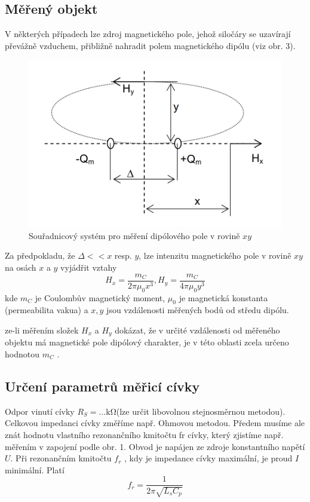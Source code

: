 \documentclass{article}
\begin{document}
\subsection{Měřený objekt}
V některých případech lze zdroj magnetického pole, jehož siločáry se uzavírají převážně vzduchem, přibližně nahradit polem magnetického dipólu (viz obr. 3).
\begin{figure}[H]
	\centering
	\includegraphics[width=0.6\linewidth]{screenshot002}
	\caption{Souřadnicový systém pro měření dipólového pole v rovině $xy$}
	\label{fig:screenshot002}
\end{figure}

Za předpokladu, že $\Delta<<x$ resp. $y$, lze intenzitu magnetického pole v rovině $xy$ na osách $x$ a $y $ vyjádřit vztahy
\begin{equation}
	H_x = \frac{m_C}{2\pi\mu_0x^3}, H_y = \frac{m_C}{4\pi\mu_0y^3}
\end{equation}
kde $m_C$ je Coulombův magnetický moment, $\mu_0$ je magnetická konstanta (permeabilita vakua) a $x,y$ jsou vzdálenosti měřených bodů od středu dipólu.

ze-li měřením složek $H_x$ a $H_y$ dokázat, že v určité vzdálenosti od měřeného objektu má magnetické pole dipólový charakter, je v této oblasti zcela určeno hodnotou $m_C$ .

\subsection{Určení parametrů měřicí cívky}
Odpor vinutí cívky $R_S = ...\si{\kilo\ohm}$(lze určit libovolnou stejnosměrnou metodou). Celkovou 
impedanci cívky změříme např. Ohmovou metodou. Předem musíme ale znát hodnotu vlastního rezonančního kmitočtu  fr  cívky, který zjistíme např. měřením v zapojení podle 
obr. 1. Obvod  je  napájen  ze  zdroje  konstantního  napětí  $U$.  Při  rezonančním  kmitočtu    $f_r$  ,  kdy  je  impedance cívky maximální, je proud  $I$  minimální. Platí
\begin{equation}
	f_r = \frac{1}{2\pi\sqrt{L_sC_p}}
\end{equation}
\end{document}
